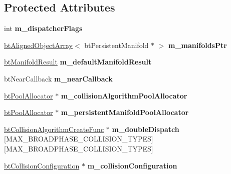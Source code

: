 \subsection*{Protected Attributes}
\begin{DoxyCompactItemize}
\item 
\mbox{\label{classbtCollisionDispatcher_a114a4b35cf3ee6a07cae74af4f801055}} 
int {\bfseries m\+\_\+dispatcher\+Flags}
\item 
\mbox{\label{classbtCollisionDispatcher_a94c21de727cf3512f76431ffd35e2109}} 
\hyperlink{classbtAlignedObjectArray}{bt\+Aligned\+Object\+Array}$<$ bt\+Persistent\+Manifold $\ast$ $>$ {\bfseries m\+\_\+manifolds\+Ptr}
\item 
\mbox{\label{classbtCollisionDispatcher_ac3c056e01165133a490b1280f5b305fa}} 
\hyperlink{classbtManifoldResult}{bt\+Manifold\+Result} {\bfseries m\+\_\+default\+Manifold\+Result}
\item 
\mbox{\label{classbtCollisionDispatcher_aea09f822bcd97e30370b77f85415e279}} 
bt\+Near\+Callback {\bfseries m\+\_\+near\+Callback}
\item 
\mbox{\label{classbtCollisionDispatcher_afc16a818c6abec823f22a5eb84ca5d79}} 
\hyperlink{classbtPoolAllocator}{bt\+Pool\+Allocator} $\ast$ {\bfseries m\+\_\+collision\+Algorithm\+Pool\+Allocator}
\item 
\mbox{\label{classbtCollisionDispatcher_a0cc3a9ef00b3e1a184545949c298584f}} 
\hyperlink{classbtPoolAllocator}{bt\+Pool\+Allocator} $\ast$ {\bfseries m\+\_\+persistent\+Manifold\+Pool\+Allocator}
\item 
\mbox{\label{classbtCollisionDispatcher_afca89f3707c82e387c02c6611366b394}} 
\hyperlink{structbtCollisionAlgorithmCreateFunc}{bt\+Collision\+Algorithm\+Create\+Func} $\ast$ {\bfseries m\+\_\+double\+Dispatch} \mbox{[}M\+A\+X\+\_\+\+B\+R\+O\+A\+D\+P\+H\+A\+S\+E\+\_\+\+C\+O\+L\+L\+I\+S\+I\+O\+N\+\_\+\+T\+Y\+P\+ES\mbox{]}\mbox{[}M\+A\+X\+\_\+\+B\+R\+O\+A\+D\+P\+H\+A\+S\+E\+\_\+\+C\+O\+L\+L\+I\+S\+I\+O\+N\+\_\+\+T\+Y\+P\+ES\mbox{]}
\item 
\mbox{\label{classbtCollisionDispatcher_a6e718ca65d16f71f2b88612a9a9b9a90}} 
\hyperlink{classbtCollisionConfiguration}{bt\+Collision\+Configuration} $\ast$ {\bfseries m\+\_\+collision\+Configuration}
\end{DoxyCompactItemize}


